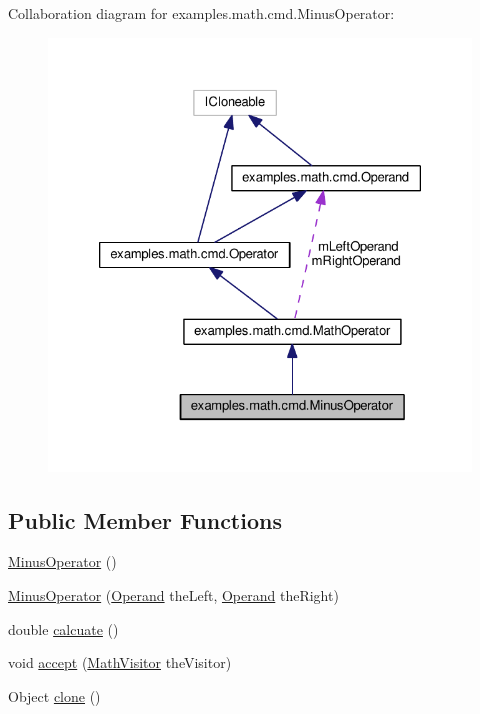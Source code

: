 Collaboration diagram for examples.\-math.\-cmd.\-Minus\-Operator\-:
\nopagebreak
\begin{figure}[H]
\begin{center}
\leavevmode
\includegraphics[width=326pt]{classexamples_1_1math_1_1cmd_1_1_minus_operator__coll__graph}
\end{center}
\end{figure}
\subsection*{Public Member Functions}
\begin{DoxyCompactItemize}
\item 
\hyperlink{classexamples_1_1math_1_1cmd_1_1_minus_operator_a4c5cdc957350a6f3492c99908a90c01a}{Minus\-Operator} ()
\item 
\hyperlink{classexamples_1_1math_1_1cmd_1_1_minus_operator_ad91db5d4448828789f051b1f37b0e76b}{Minus\-Operator} (\hyperlink{interfaceexamples_1_1math_1_1cmd_1_1_operand}{Operand} the\-Left, \hyperlink{interfaceexamples_1_1math_1_1cmd_1_1_operand}{Operand} the\-Right)
\item 
double \hyperlink{classexamples_1_1math_1_1cmd_1_1_minus_operator_ae0b4f472b4092248b6e88e790316d0fc}{calcuate} ()
\item 
void \hyperlink{classexamples_1_1math_1_1cmd_1_1_minus_operator_ae6595f830b06618e2b894bdcc6742343}{accept} (\hyperlink{interfaceexamples_1_1math_1_1_math_visitor}{Math\-Visitor} the\-Visitor)
\item 
Object \hyperlink{classexamples_1_1math_1_1cmd_1_1_minus_operator_ae081bc6423e4b04aa3aeb4f52d93bdbd}{clone} ()
\end{DoxyCompactItemize}
